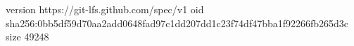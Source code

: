version https://git-lfs.github.com/spec/v1
oid sha256:0bb5df59d70aa2add0648fad97c1dd207dd1c23f74df47bba1f92266fb265d3c
size 49248
